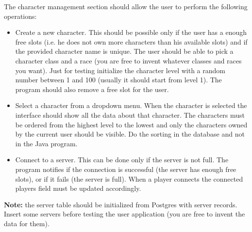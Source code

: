 \documentclass[10pt,a4paper]{article}
\begin{document}
The character management section should allow the user to perform the following operations:
\begin{itemize}
\item Create a new character. This should be possible only if the user has a enough free slots (i.e. he does not own more characters than his available slots) and if the provided character name is unique. The user should be able to pick a character class and a race (you are free to invent whatever classes and races you want). Just for testing initialize the character level with a random number between 1 and 100 (usually it should start from level 1). The program should also remove a free slot for the user.
\item Select a character from a dropdown menu. When the character is selected the interface should show all the data about that character. The characters must be ordered from the highest level to the lowest and only the characters owned by the current user should be visible. Do the sorting in the database and not in the Java program.
\item Connect to a server. This can be done only if the server is not full. The program notifies if the connection is successful (the server has enough free slots), or if it fails (the server is full). When a player connects the connected players field must be updated accordingly.
\end{itemize}

\textbf{Note:} the server table should be initialized from Postgres with server records. Insert some servers before testing the user application (you are free to invent the data for them).
\end{document}
